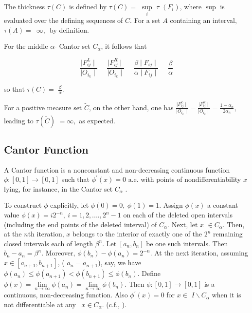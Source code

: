 \documentclass[12pt]{article}
\begin{document}
The thickness $\tau (C)$ is defined by $\tau (C)=$ $\underset{i}{\sup }$ $%
\tau $ $(F_{i})$, where $\sup $ is evaluated over the defining sequences of $%
C.$ For a set $A$ containing an interval, $\tau (A)=$\ $\infty ,$\ by
definition.

\vspace{.25cm}

For the middle $\alpha $- Cantor set $C_{\alpha }$, it follows that

$$\frac{\mid F_{ij}^{L}\mid }{\mid O_{i_k}\mid }=\frac{\mid F_{ij}^{R}\mid }{
\mid O_{i_k}\mid }=\frac{\beta \mid F_{ij}\mid }{\alpha \mid F_{ij}\mid }=
\frac{\beta }{\alpha }$$

\noindent so that $\tau (C)=$ $\frac{\beta }{\alpha }$.

\vspace{.25cm}

For a positive measure set $\tilde{C}$, on the other hand, one has $\frac{
\mid F_{ij}^{L}\mid }{\mid O_{i_k}\mid }=\frac{\mid F_{ij}^{R}\mid }{\mid
O_{i_k}\mid }=\frac{1-\alpha _{n}}{2\alpha _{n}}$, leading to $\tau (\tilde{C})
$ $=\infty ,$ as expected.

\subsection{Cantor Function} 
A Cantor function is a  nonconstant and non-decreasing continuous function $\phi :[0,1]\rightarrow [0,1]$ such that $\phi^{\prime}(x)=0$ a.e. with points of nondifferentiability  $x$ lying, for instance, in the Cantor set $ C_{\alpha}$ . 
\vspace{.25cm}
 
 To construct $\phi$ explicitly, let $\phi (0)=0,\ \phi (1)=1.$ Assign $\phi (x)$ a constant value $\phi (x)=i2^{-n},\ i=1,2,....,2^n-1$ on each of %
the deleted open intervals (including the end points of the deleted
interval) of $C_{\alpha}$. 
Next, let $x$ $\in
C_{\alpha}$. Then, at the $n$th iteration,  $x$ belongs to the interior of exactly one of the $2^{n}$
remaining closed intervals each of length $\beta^n $. Let $[a_n, b_n]$
be one such intervals. Then $b_n-a_n=\beta^n$. Moreover,  $\phi(b_n)-\phi(a_n)=2^{-n}$.
At the next iteration,
assuming $x\in [a_{n+1}, b_{n+1}]$, %
( $a_n=a_{n+1}$), say, we have $\phi (a _{n})\leq  \phi (a_{n+1})<\phi(b _{n+1})\leq \phi (b _{n})$. %
Define $\phi (x)=\underset{n\rightarrow \infty }{\lim }\phi (a _{n})=\underset{n\rightarrow \infty}{\lim }\phi (b _{n})$. Then $\phi :[0,1]\rightarrow [ 0,1]$
is a continuous, non-decreasing function. Also $\phi ^{\prime }(x)=0$ for $%
x\in $ $I\backslash C_{\alpha}$ when it is not differentiable at any \ $x\in C_{\alpha}.$ (c.f., \cite{sd1, sd2}).
\end{document}
